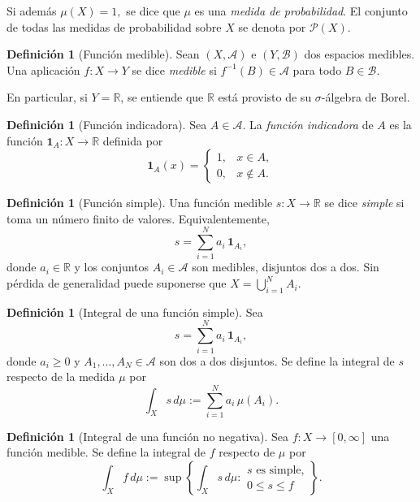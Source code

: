 \documentclass[12pt, a4paper]{amsbook}
\theoremstyle{remark}
\theoremstyle{definition}
\newtheorem{defi}[teo]{Definición}
\numberwithin{section}{chapter}
\numberwithin{subsection}{section}
\numberwithin{equation}{section}
\numberwithin{figure}{chapter}
\begin{document}
Si además
\(
\mu(X)=1,
\)
se dice que \(\mu\) es una \emph{medida de probabilidad}. El conjunto de todas las medidas de probabilidad sobre \(X\) se denota por
\(
\mathcal P(X).
\)

\begin{defi}[Función medible]
Sean \((X,\mathcal A)\) e \((Y,\mathcal B)\) dos espacios medibles. Una aplicación
\(
f\colon X\to Y
\)
se dice \emph{medible} si
\(
f^{-1}(B)\in\mathcal A
\)
para todo \(B\in\mathcal B\).

En particular, si \(Y=\mathbb R\), se entiende que \(\mathbb R\) está provisto de su \(\sigma\)-álgebra de Borel.
\end{defi}

\begin{defi}[Función indicadora]
Sea \(A\in\mathcal A\). La \emph{función indicadora} de \(A\) es la función
\(
\mathbf 1_A\colon X\to\mathbb R
\)
definida por
\[
\mathbf 1_A(x)=
\begin{cases}
1,& x\in A,\\
0,& x\notin A.
\end{cases}
\]
\end{defi}
\begin{defi}[Función simple]
Una función medible \(s\colon X\to\mathbb R\) se dice \emph{simple} si toma un número finito de valores. Equivalentemente,
\[
s=\sum_{i=1}^N a_i\,\mathbf 1_{A_i},
\]
donde \(a_i\in\mathbb R\) y los conjuntos \(A_i\in\mathcal A\) son medibles, disjuntos dos a dos. Sin pérdida de generalidad puede suponerse que $X=\bigcup_{i=1}^N A_i$.
\end{defi}

\begin{defi}[Integral de una función simple]
Sea
\[
s=\sum_{i=1}^N a_i\, \mathbf 1_{A_i},
\]
donde \(a_i\ge0\) y \(A_1,\dots,A_N\in\mathcal A\) son dos a dos disjuntos. Se define la integral de \(s\) respecto de la medida \(\mu\) por
\[
\int_X s\,d\mu
:=
\sum_{i=1}^N a_i\,\mu(A_i).
\]
\end{defi}

\begin{defi}[Integral de una función no negativa]
Sea \(f\colon X\to[0,\infty]\) una función medible. Se define la integral de \(f\) respecto de \(\mu\) por
\[
\int_X f\,d\mu
:=
\sup\left\{
\int_X s\,d\mu
:
\begin{array}{c}
s\text{ es simple,}\\
0\le s\le f
\end{array}
\right\}.
\]
\end{defi}
\end{document}
